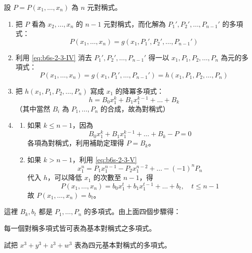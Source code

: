 設 $P=P(x_1, \dots, x_n)$ 為 $n$ 元對稱式。
\begin{enumerate}[label=(\Roman*), leftmargin=2em]
  \item 把 $P$ 看為 $x_2, \dots, x_n$ 的 $n-1$ 元對稱式，而化解為 $P_1', P_2', \dots, P_{n-1}'$ 的多項式：
  \[ P(x_1, \dots, x_n) = g(x_1, P_1', P_2', \dots, P_{n-1}') \]
  \item 利用 \eqref{eq:b6s-2-3-IV} 消去 $P_1', P_2', \dots, P_{n-1}'$ 得一以 $x_1, P_1, P_2, \dots, P_n$ 為元的多項式：
  \[ P(x_1, \dots, x_n) = g(x_1, P_1', \dots, P_{n-1}') = h(x_1, P_1, P_2, \dots, P_n) \]
  \item 把 $h(x_1, P_1, P_2, \dots, P_n)$ 寫成 $x_1$ 的降冪多項式：
  \[ h = B_0 x_1^k + B_1 x_1^{k-1} + \dots + B_k \]
  （其中當然 $B_i$ 為 $P_1, \dots, P_n$ 的合成，故為對稱式）
  \item 
  \begin{enumerate}[label=(\alph*)]
    \item 如果 $k \le n-1$，因為
    \[ B_0 x_1^k + B_1 x_1^{k-1} + \dots + B_k - P = 0 \]
    各項為對稱式，利用補助定理得 $P = B_k$。
    \item 如果 $k > n-1$，利用 \eqref{eq:b6s-2-3-V}
    \[ x_1^n = P_1 x_1^{n-1} - P_2 x_1^{n-2} + \dots - (-1)^n P_n \]
    代入 $h$，可以降低 $x_1$ 的次數至 $n-1$，得
    \[ P(x_1, \dots, x_n) = b_0 x_1^t + b_1 x_1^{t-1} + \dots + b_t, \quad t \le n-1 \]
    故 $P(x_1, \dots, x_n) = b_t$。
  \end{enumerate}
\end{enumerate}
這裡 $B_k, b_t$ 都是 $P_1, \dots, P_n$ 的多項式。由上面四個步驟得：

\begin{theorem}[對稱式基本定理]\label{thm:b6s-2-fundamental-symmetric}
每一個對稱多項式皆可表為基本對稱式之多項式。
\end{theorem}

\begin{example}\label{ex:b6s-2-12}
試把 $x^3+y^3+z^3+w^3$ 表為四元基本對稱式的多項式。
\end{example}

